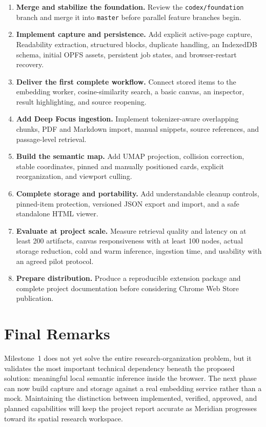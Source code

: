 \documentclass{tietreport}
\begin{document}
\begin{enumerate}
  \item \textbf{Merge and stabilize the foundation.} Review the
    \texttt{codex/foundation} branch and merge it into \texttt{master} before parallel feature
    branches begin.

  \item \textbf{Implement capture and persistence.} Add explicit active-page capture,
    Readability extraction, structured blocks, duplicate handling, an IndexedDB schema,
    initial OPFS assets, persistent job states, and browser-restart recovery.

  \item \textbf{Deliver the first complete workflow.} Connect stored items to the embedding
    worker, cosine-similarity search, a basic canvas, an inspector, result highlighting, and
    source reopening.

  \item \textbf{Add Deep Focus ingestion.} Implement tokenizer-aware overlapping chunks,
    PDF and Markdown import, manual snippets, source references, and passage-level retrieval.

  \item \textbf{Build the semantic map.} Add UMAP projection, collision correction, stable
    coordinates, pinned and manually positioned cards, explicit reorganization, and viewport
    culling.

  \item \textbf{Complete storage and portability.} Add understandable cleanup controls,
    pinned-item protection, versioned JSON export and import, and a safe standalone HTML
    viewer.

  \item \textbf{Evaluate at project scale.} Measure retrieval quality and latency on at least
    200 artifacts, canvas responsiveness with at least 100 nodes, actual storage reduction,
    cold and warm inference, ingestion time, and usability with an agreed pilot protocol.

  \item \textbf{Prepare distribution.} Produce a reproducible extension package and complete
    project documentation before considering Chrome Web Store publication.
\end{enumerate}

\section{Final Remarks}

Milestone~1 does not yet solve the entire research-organization problem, but it validates the
most important technical dependency beneath the proposed solution: meaningful local semantic
inference inside the browser. The next phase can now build capture and storage against a real
embedding service rather than a mock. Maintaining the distinction between implemented,
verified, approved, and planned capabilities will keep the project report accurate as Meridian
progresses toward its spatial research workspace.


\printbibliography[heading=bibintoc]
\end{document}
